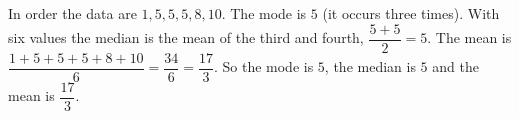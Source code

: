 In order the data are $1,5,5,5,8,10$. The mode is $5$ (it occurs three times). With six values the median is the mean of the third and fourth, $\dfrac{5+5}{2}=5$. The mean is $\dfrac{1+5+5+5+8+10}{6}=\dfrac{34}{6}=\dfrac{17}{3}$. So the mode is $\boxed{5}$, the median is $\boxed{5}$ and the mean is $\boxed{\dfrac{17}{3}}$.
